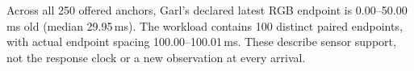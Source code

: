 Across all 250 offered anchors, Garl's declared latest RGB endpoint is 0.00--50.00\,ms old (median 29.95\,ms). The workload contains 100 distinct paired endpoints, with actual endpoint spacing 100.00--100.01\,ms. These describe sensor support, not the response clock or a new observation at every arrival.

